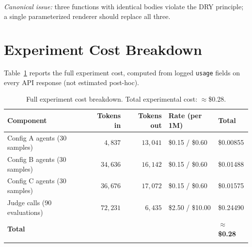 \documentclass[pdflatex,sn-mathphys-num]{sn-jnl}
\theoremstyle{thmstyleone}
\theoremstyle{thmstyletwo}
\theoremstyle{thmstylethree}
\begin{document}
\begin{appendices}
\emph{Canonical issue:} three functions with identical bodies violate the DRY principle; a single parameterized renderer should replace all three.

\section{Experiment Cost Breakdown}\label{app:cost}

Table~\ref{tab:cost} reports the full experiment cost, computed from logged \texttt{usage} fields on every API response (not estimated post-hoc).

\begin{table}[ht]
\caption{Full experiment cost breakdown. Total experimental cost: $\approx$\$0.28.}
\label{tab:cost}
\begin{tabular}{@{}lrrll@{}}
\toprule
Component & Tokens in & Tokens out & Rate (per 1M) & Total \\
\midrule
Config A agents (30 samples) & $4{,}837$ & $13{,}041$ & \$0.15 / \$0.60 & \$0.00855 \\
Config B agents (30 samples) & $34{,}636$ & $16{,}142$ & \$0.15 / \$0.60 & \$0.01488 \\
Config C agents (30 samples) & $36{,}676$ & $17{,}072$ & \$0.15 / \$0.60 & \$0.01575 \\
Judge calls (90 evaluations) & $72{,}231$ & $6{,}435$  & \$2.50 / \$10.00 & \$0.24490 \\
\midrule
\textbf{Total} & & & & \textbf{$\approx$\$0.28} \\
\botrule
\end{tabular}
\end{table}

\end{appendices}
\end{document}
